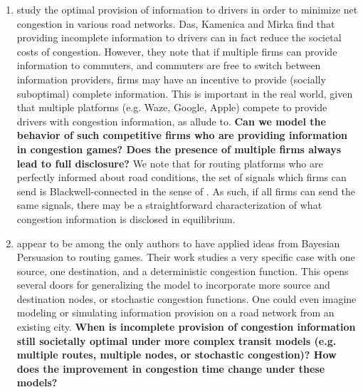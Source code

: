\documentclass[JEL]{AEA}
\begin{document}
\begin{enumerate}
\item \cite{das-2017} study the optimal provision of information to drivers in order to minimize net congestion in various road networks. Das, Kamenica and Mirka find that providing incomplete information to drivers can in fact reduce the societal costs of congestion. However, they note that if multiple firms can provide information to commuters, and commuters are free to switch between information providers, firms may have an incentive to provide (socially suboptimal) complete information. This is important in the real world, given that multiple platforms (e.g. Waze, Google, Apple) compete to provide drivers with congestion information, as \cite{ostrovsky-2018} allude to. \textbf{Can we model the behavior of such competitive firms who are providing information in congestion games? Does the presence of multiple firms always lead to full disclosure?} We note that for routing platforms who are perfectly informed about road conditions, the set of signals which firms can send is Blackwell-connected in the sense of \cite{gentzkow-2016}. As such, if all firms can send the same signals, there may be a straightforward characterization of what congestion information is disclosed in equilibrium.

\item \cite{das-2017} appear to be among the only authors to have applied ideas from Bayesian Persuasion to routing games. Their work studies a very specific case with one source, one destination, and a deterministic congestion function. This opens several doors for generalizing the model to incorporate more source and destination nodes, or stochastic congestion functions. One could even imagine modeling or simulating information provision on a road network from an existing city. \textbf{When is incomplete provision of congestion information still societally optimal under more complex transit models (e.g. multiple routes, multiple nodes, or stochastic congestion)? How does the improvement in congestion time change under these models?}


\end{enumerate}






\end{document}
